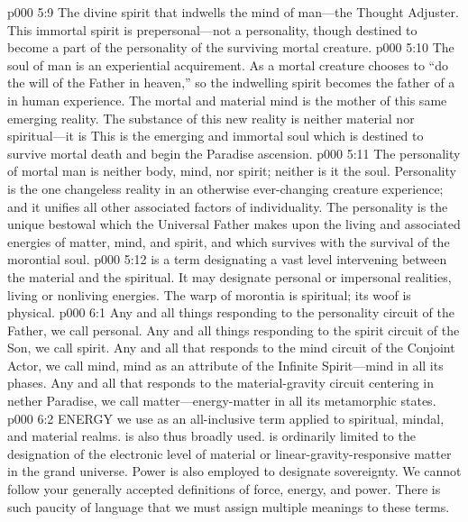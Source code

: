 \vs p000 5:9 \bibnobreakspace {} The divine spirit that indwells the mind of man---the Thought Adjuster. This immortal spirit is prepersonal---not a personality, though destined to become a part of the personality of the surviving mortal creature.
\vs p000 5:10 \bibnobreakspace {} The soul of man is an experiential acquirement. As a mortal creature chooses to “do the will of the Father in heaven,” so the indwelling spirit becomes the father of a  in human experience. The mortal and material mind is the mother of this same emerging reality. The substance of this new reality is neither material nor spiritual---it is  This is the emerging and immortal soul which is destined to survive mortal death and begin the Paradise ascension.
\pc \vs p000 5:11  The personality of mortal man is neither body, mind, nor spirit; neither is it the soul. Personality is the one changeless reality in an otherwise ever\hyp{}changing creature experience; and it unifies all other associated factors of individuality. The personality is the unique bestowal which the Universal Father makes upon the living and associated energies of matter, mind, and spirit, and which survives with the survival of the morontial soul.\plusone
\pc \vs p000 5:12  is a term designating a vast level intervening between the material and the spiritual. It may designate personal or impersonal realities, living or nonliving energies. The warp of morontia is spiritual; its woof is physical.
\vs p000 6:1 Any and all things responding to the personality circuit of the Father, we call personal. Any and all things responding to the spirit circuit of the Son, we call spirit. Any and all that responds to the mind circuit of the Conjoint Actor, we call mind, mind as an attribute of the Infinite Spirit---mind in all its phases. Any and all that responds to the material\hyp{}gravity circuit centering in nether Paradise, we call matter---energy\hyp{}matter in all its metamorphic states.
\pc \vs p000 6:2 ENERGY we use as an all\hyp{}inclusive term applied to spiritual, mindal, and material realms.  is also thus broadly used.  is ordinarily limited to the designation of the electronic level of material or linear\hyp{}gravity\hyp{}responsive matter in the grand universe. Power is also employed to designate sovereignty. We cannot follow your generally accepted definitions of force, energy, and power. There is such paucity of language that we must assign multiple meanings to these terms.
